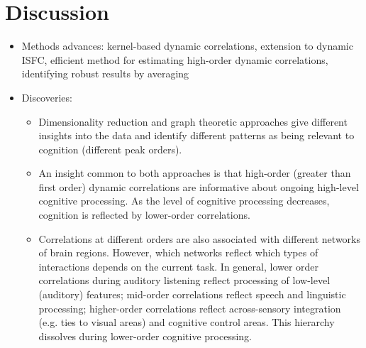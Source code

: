 \documentclass[english]{article}
\begin{document}
\section*{Discussion}

\begin{itemize}
  \item Methods advances: kernel-based dynamic correlations, extension to
    dynamic ISFC, efficient method for estimating high-order dynamic
    correlations, identifying robust results by averaging
  \item Discoveries:
    \begin{itemize}
      \item Dimensionality reduction and graph theoretic approaches
        give different insights into the data and identify different
        patterns as being relevant to cognition (different peak
        orders).
        \item An insight common to both approaches is that high-order
          (greater than first order) dynamic correlations are
          informative about ongoing high-level cognitive processing.
          As the level of cognitive processing decreases, cognition is
          reflected by lower-order correlations.
        \item Correlations at different orders are also associated
          with different networks of brain regions.  However, which
          networks reflect which types of interactions depends on the
          current task.  In general, lower order correlations during
          auditory listening reflect processing of low-level
          (auditory) features; mid-order correlations reflect speech
          and linguistic processing; higher-order correlations reflect
          across-sensory integration (e.g. ties to visual areas) and
          cognitive control areas.  This hierarchy dissolves during
          lower-order cognitive processing.
      \end{itemize}
  \end{itemize}
\end{document}

